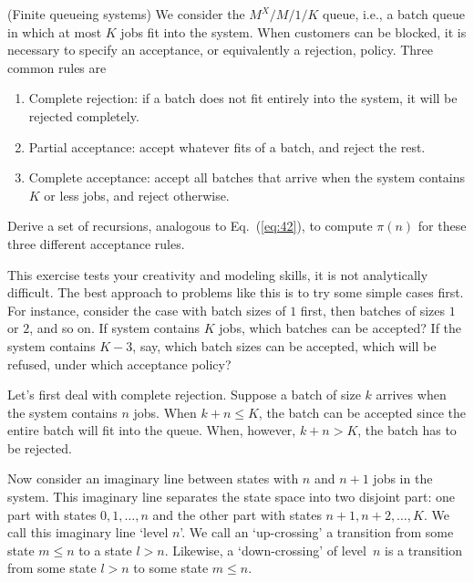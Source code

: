 \begin{exercise}[\faPhoto](Finite queueing systems) We consider the $M^X/M/1/K$
queue, i.e., a batch queue in which at most $K$ jobs fit into the
system. When customers can be blocked, it is necessary to specify an
acceptance, or equivalently a rejection, policy. Three common rules are
\begin{enumerate}
\item Complete rejection: if a batch does not fit entirely into the system, it will be rejected completely.
\item Partial acceptance: accept whatever fits of a batch, and reject the rest.
\item Complete acceptance: accept all batches that arrive when the
  system contains $K$ or less jobs, and reject otherwise.
\end{enumerate}
Derive a set of recursions, analogous to Eq.~(\ref{eq:42}), to compute
$\pi(n)$ for these three different acceptance rules.  
\begin{hint}
This
  exercise tests your creativity and modeling skills, it is not
  analytically difficult.  The best approach to problems like this is
  to try some simple cases first. For instance, consider the case with
  batch sizes of $1$ first, then batches of sizes $1$ or $2$, and so
  on. If system contains $K$ jobs, which batches can be accepted? If
  the system contains $K-3$, say, which batch sizes can be accepted,
  which will be refused, under which acceptance policy? 
\end{hint}
\begin{solution}
  Let's first deal with complete rejection. Suppose a batch of size
  $k$ arrives when the system contains $n$ jobs. When $k+n \leq K$,
  the batch can be accepted since the entire batch will fit into the
  queue.  When, however, $k+n> K$, the batch has to be rejected. 

  Now consider an imaginary line between states with $n$ and $n+1$
  jobs in the system. This imaginary line separates the state space
  into two disjoint part: one part with states $0, 1, \ldots, n$ and
  the other part with states $n+1, n+2, \ldots, K$. We call this
  imaginary line `level $n$'.  We call an `up-crossing' a transition
  from some state $m\leq n$ to a state $l> n$. Likewise, a `down-crossing'  of level~$n$ is a transition from some state $l> n$ to some state $m\leq n$.


\end{solution}
\end{exercise}
